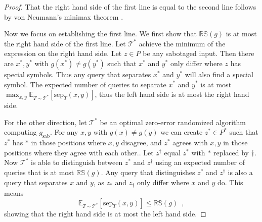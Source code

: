 \documentclass{toc}
\newcommand{\clT}{\mathcal{T}}
\newcommand{\RS}{\mathbb{RS}}
\newcommand{\sep}{\mathrm{sep}}
\newcommand{\sab}{\mathrm{sab}}
\newcommand{\E}{\mathbb{E}}
\begin{document}
\begin{proof}
That the right hand side of the first line is equal to the second line follows by von Neumann's minimax theorem \cite{vonNeumann}.

Now we focus on establishing the first line.  We first show that $\RS(g)$ is at most the right hand side of the first line.
Let $\clT^*$ achieve the minimum of the expression on the right hand side.  Let $z \in P$ be any sabotaged input.  Then there 
are $x^*,y^*$ with $g(x^*) \ne g(y^*)$ such that $x^*$ and $y^*$ only differ where $z$ has special symbols.  Thus any 
query that separates $x^*$ and $y^*$ will also find a special symbol.  The expected number of queries to separate 
$x^*$ and $y^*$ is at most $\max_{x,y} \E_{T \sim \clT^*} [\sep_T(x,y)]$, thus the left hand side is at most the right hand side.

For the other direction, let $\clT^*$ be an optimal zero-error randomized algorithm computing $g_{\sab}$.  For any $x,y$ with 
$g(x) \ne g(y)$ we can create $z^\ast \in P^{\ast}$ such that $z^\ast$ has $\ast$ in those positions where $x,y$ disagree, and 
$z^\ast$ agrees with $x,y$ in those positions where they agree with each other..  Let $z^\dag$ equal $z^\ast$
with $\ast$ replaced by $\dag$.  Now $\clT^*$ is able to distinguish between $z^\ast$ and $z^\dagger$ using an expected number 
of queries that is at most $\RS(g)$.  Any query that distinguishes $z^\ast$ and $z^\dagger$ is also a query that separates $x$ and $y$, 
as $z_\ast$ and $z_\dagger$ only differ where $x$ and $y$ do.  This means
\[
\E_{T \sim \clT^*} [\sep_T(x,y)] \le \RS(g) \enspace ,
\]
showing that the right hand side is at most the left hand side.
\end{proof}
\end{document}
